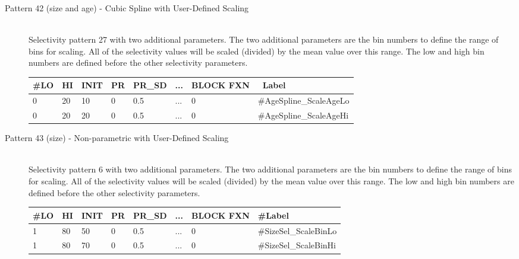 \begin{description}
	\item[Pattern 42 (size and age) - Cubic Spline with User-Defined Scaling]\hfil\\
	Selectivity pattern 27 with two additional parameters. The two additional parameters are the bin numbers to define the range of bins for scaling. All of the selectivity values will be scaled (divided) by the mean value over this range. The low and high bin numbers are defined before the other selectivity parameters.

	\begin{center}
		\begin{longtable}{p{0.8cm} p{0.8cm} p{1cm} p{0.8cm} p{1.75cm}p{1cm} p{1.2cm} p{5.2cm}}
		\hline
		\#LO & HI & INIT & PR & PR\_SD & ... & BLOCK FXN & \ Label \\
		\hline
		0 & 20 & 10 & 0 & 0.5 &  ... & 0 & \#AgeSpline\_ScaleAgeLo \\
		0 & 20 & 20 & 0 & 0.5 & ... & 0 & \#AgeSpline\_ScaleAgeHi \\
		\hline
		\end{longtable}
	\end{center}
\end{description}

\begin{description}
	\item[Pattern 43 (size) - Non-parametric with User-Defined Scaling]\hfil\\
	Selectivity pattern 6 with two additional parameters. The two additional parameters are the bin numbers to define the range of bins for scaling. All of the selectivity values will be scaled (divided) by the mean value over this range. The low and high bin numbers are defined before the other selectivity parameters.
	
	\begin{center}
		\begin{longtable}{p{0.8cm} p{0.8cm} p{1cm} p{0.8cm} p{1.75cm}p{1cm} p{1.2cm} p{5.2cm}}
			\hline
			\#LO & HI & INIT & PR & PR\_SD  & ... & BLOCK FXN & \#Label \\
			\hline
			1 & 80 & 50 & 0 & 0.5  & ... & 0 & \#SizeSel\_ScaleBinLo \\
			1 & 80 & 70 & 0 & 0.5  & ... & 0 & \#SizeSel\_ScaleBinHi \\
			\hline
		\end{longtable}
	\end{center}
\end{description}

